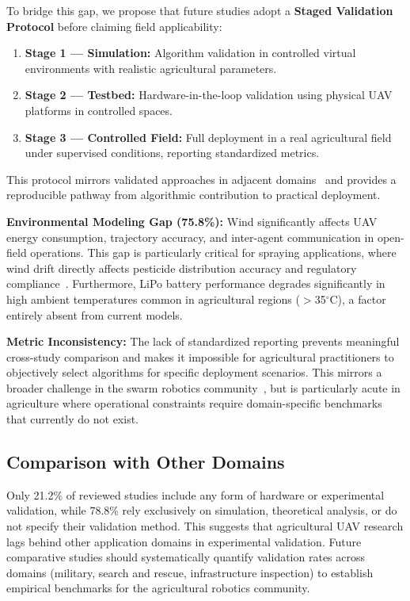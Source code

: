\documentclass[review,3p,times]{elsarticle}
\begin{document}
To bridge this gap, we propose that future studies adopt a \textbf{Staged Validation Protocol} before claiming field applicability:
\begin{enumerate}
  \item \textbf{Stage 1 --- Simulation:} Algorithm validation in controlled virtual environments with realistic agricultural parameters.
  \item \textbf{Stage 2 --- Testbed:} Hardware-in-the-loop validation using physical UAV platforms in controlled spaces.
  \item \textbf{Stage 3 --- Controlled Field:} Full deployment in a real agricultural field under supervised conditions, reporting standardized metrics.
\end{enumerate}
This protocol mirrors validated approaches in adjacent domains~\cite{shafiq2022} and provides a reproducible pathway from algorithmic contribution to practical deployment.

\textbf{Environmental Modeling Gap (75.8\%):} Wind significantly affects UAV energy consumption, trajectory accuracy, and inter-agent communication in open-field operations. This gap is particularly critical for spraying applications, where wind drift directly affects pesticide distribution accuracy and regulatory compliance~\cite{liu2021}. Furthermore, LiPo battery performance degrades significantly in high ambient temperatures common in agricultural regions ($>$35$^\circ$C), a factor entirely absent from current models.

\textbf{Metric Inconsistency:} The lack of standardized reporting prevents meaningful cross-study comparison and makes it impossible for agricultural practitioners to objectively select algorithms for specific deployment scenarios. This mirrors a broader challenge in the swarm robotics community~\cite{puente2022,sharma2022}, but is particularly acute in agriculture where operational constraints require domain-specific benchmarks that currently do not exist.

\subsection{Comparison with Other Domains}
Only 21.2\% of reviewed studies include any form of hardware or experimental validation, while 78.8\% rely exclusively on simulation, theoretical analysis, or do not specify their validation method. This suggests that agricultural UAV research lags behind other application domains in experimental validation. Future comparative studies should systematically quantify validation rates across domains (military, search and rescue, infrastructure inspection) to establish empirical benchmarks for the agricultural robotics community.
\end{document}
